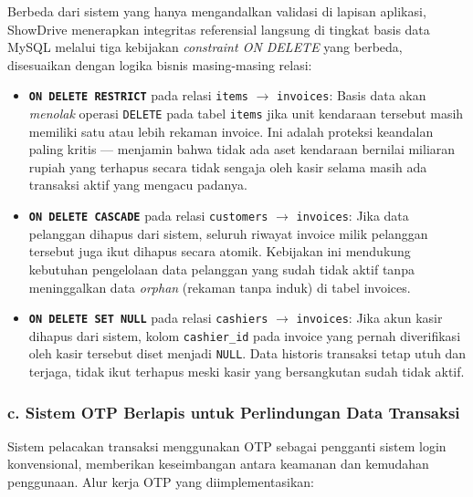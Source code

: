 \documentclass[11pt, a5paper]{article}
\begin{document}
Berbeda dari sistem yang hanya mengandalkan validasi di lapisan aplikasi,
ShowDrive menerapkan integritas referensial langsung di tingkat basis data MySQL
melalui tiga kebijakan \textit{constraint ON DELETE} yang berbeda, disesuaikan
dengan logika bisnis masing-masing relasi:

\begin{itemize}
  \item \textbf{\texttt{ON DELETE RESTRICT}} pada relasi \texttt{items}
        $\rightarrow$ \texttt{invoices}: Basis data akan \textit{menolak} operasi
        \texttt{DELETE} pada tabel \texttt{items} jika unit kendaraan tersebut
        masih memiliki satu atau lebih rekaman invoice. Ini adalah proteksi
        keandalan paling kritis — menjamin bahwa tidak ada aset kendaraan bernilai
        miliaran rupiah yang terhapus secara tidak sengaja oleh kasir selama masih
        ada transaksi aktif yang mengacu padanya.

  \item \textbf{\texttt{ON DELETE CASCADE}} pada relasi \texttt{customers}
        $\rightarrow$ \texttt{invoices}: Jika data pelanggan dihapus dari sistem,
        seluruh riwayat invoice milik pelanggan tersebut juga ikut dihapus secara
        atomik. Kebijakan ini mendukung kebutuhan pengelolaan data pelanggan yang
        sudah tidak aktif tanpa meninggalkan data \textit{orphan} (rekaman tanpa
        induk) di tabel invoices.

  \item \textbf{\texttt{ON DELETE SET NULL}} pada relasi \texttt{cashiers}
        $\rightarrow$ \texttt{invoices}: Jika akun kasir dihapus dari sistem,
        kolom \texttt{cashier\_id} pada invoice yang pernah diverifikasi oleh
        kasir tersebut diset menjadi \texttt{NULL}. Data historis transaksi tetap
        utuh dan terjaga, tidak ikut terhapus meski kasir yang bersangkutan
        sudah tidak aktif.
\end{itemize}

\subsubsection*{c. Sistem OTP Berlapis untuk Perlindungan Data Transaksi}

Sistem pelacakan transaksi menggunakan OTP sebagai pengganti sistem login
konvensional, memberikan keseimbangan antara keamanan dan kemudahan penggunaan.
Alur kerja OTP yang diimplementasikan:
\end{document}
